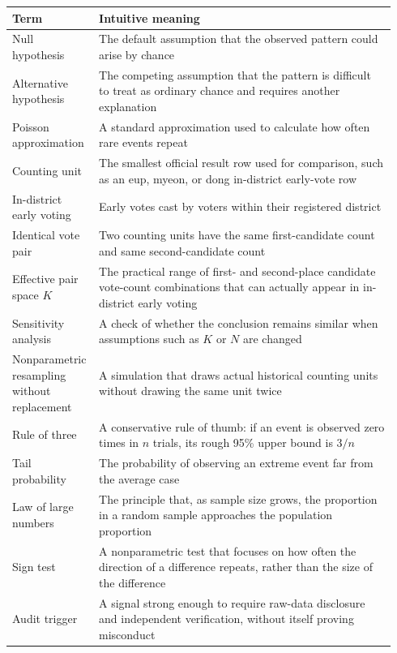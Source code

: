 \documentclass[preprint]{IEIE}
\begin{document}
\begin{center}
\small
\begin{tabular}{>{\raggedright\arraybackslash}p{0.18\linewidth}>{\raggedright\arraybackslash}p{0.76\linewidth}}
\toprule
Term & Intuitive meaning \\
\midrule
Null hypothesis & The default assumption that the observed pattern could arise by chance \\
Alternative hypothesis & The competing assumption that the pattern is difficult to treat as ordinary chance and requires another explanation \\
Poisson approximation & A standard approximation used to calculate how often rare events repeat \\
Counting unit & The smallest official result row used for comparison, such as an eup, myeon, or dong in-district early-vote row \\
In-district early voting & Early votes cast by voters within their registered district \\
Identical vote pair & Two counting units have the same first-candidate count and same second-candidate count \\
Effective pair space \(K\) & The practical range of first- and second-place candidate vote-count combinations that can actually appear in in-district early voting \\
Sensitivity analysis & A check of whether the conclusion remains similar when assumptions such as \(K\) or \(N\) are changed \\
Nonparametric resampling without replacement & A simulation that draws actual historical counting units without drawing the same unit twice \\
Rule of three & A conservative rule of thumb: if an event is observed zero times in \(n\) trials, its rough 95\% upper bound is \(3/n\) \\
Tail probability & The probability of observing an extreme event far from the average case \\
Law of large numbers & The principle that, as sample size grows, the proportion in a random sample approaches the population proportion \\
Sign test & A nonparametric test that focuses on how often the direction of a difference repeats, rather than the size of the difference \\
Audit trigger & A signal strong enough to require raw-data disclosure and independent verification, without itself proving misconduct \\
\bottomrule
\end{tabular}
\end{center}
\end{document}

